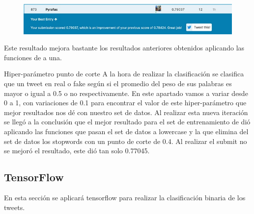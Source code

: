\documentclass[12pt]{article}
\begin{document}
\begin{figure}[H]
    \centering
    \includegraphics[scale = 0.9]{imgs/tweet_1.jpg}
    \label{tp:fig:equilibrium}
\end{figure}


Este resultado mejora bastante los resultados anteriores obtenidos aplicando las funciones de a una.

Hiper-parámetro punto de corte
A la hora de realizar la clasificación se clasifica que un tweet en real o fake según si el promedio del peso de sus palabras es mayor o igual a 0.5 o no respectivamente.
En este apartado vamos a variar desde 0 a 1, con variaciones de 0.1 para encontrar el valor de este hiper-parámetro que mejor resultados nos dé con nuestro set de datos.
Al realizar esta nueva iteración se llegó a la conclusión que el mejor resultado para el set de entrenamiento de dió aplicando las funciones que pasan el set de datos a lowercase y la que elimina del set de datos los stopwords con un punto de corte de 0.4. Al realizar el submit no se mejoró el resultado, este dió tan solo 0.77045.


\newpage
\subsection{TensorFlow}
En esta sección se aplicará tensorflow para realizar la clasificación binaria de los tweets.
\end{document}

